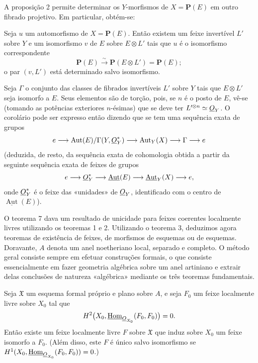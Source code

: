 A proposição 2 permite determinar os $Y$-morfismos de $X=\mathbf P(E)$ em
outro fibrado projetivo. Em particular, obtém-se:

 Seja $u$ um automorfismo de $X=\mathbf P(E)$. Então
existem um feixe invertível $L'$ sobre $Y$ e um isomorfismo $v$ de $E$ sobre
$E\otimes L'$ tais que $u$ é o isomorfismo correspondente
\[
  \mathbf P(E)\xrightarrow{\sim}\mathbf P(E\otimes L')=\mathbf P(E);
\]
o par $(v,L')$ está determinado salvo isomorfismo.

Seja $\Gamma$ o conjunto das classes de fibrados invertíveis $L'$ sobre $Y$
tais que $E\otimes L'$ seja isomorfo a $E$. Seus elementos são de torção, pois,
se $n$ é o posto de $E$, vê-se (tomando as potências exteriores $n$-ésimas)
que se deve ter $L'^{\otimes n}\simeq\underline{O}_Y$. O corolário pode ser expresso
então dizendo que se tem uma sequência exata de grupos
\[
  e\longrightarrow
  \operatorname{Aut}(E)/\Gamma(Y,\underline{O}_Y^*)
  \longrightarrow \operatorname{Aut}_Y(X)
  \longrightarrow \Gamma\longrightarrow e
\]
(deduzida, de resto, da sequência exata de cohomologia obtida a partir
da seguinte sequência exata de feixes de grupos
\[
  e\longrightarrow \underline{O}_Y^*
  \longrightarrow \underline{\operatorname{Aut}}(E)
  \longrightarrow \underline{\operatorname{Aut}}_Y(X)
  \longrightarrow e,
\]
onde $\underline{O}_Y^*$ é o feixe das «unidades» de $\underline{O}_Y$, identificado com o
centro de $\underline{\operatorname{Aut}}(E)$).


O teorema 7 dava um resultado de unicidade para feixes coerentes localmente
livres utilizando os teoremas 1 e 2. Utilizando o teorema 3, deduzimos agora
teoremas de existência de feixes, de morfismos de esquemas ou de esquemas.
Doravante, $A$ denota um anel noetheriano local, separado e completo. O método
geral consiste sempre em efetuar construções formais, o que consiste
essencialmente em fazer geometria algébrica sobre um anel artiniano e extrair
delas conclusões de natureza «algébrica» mediante os três teoremas
fundamentais.

 Seja $\mathfrak X$ um esquema formal próprio e plano
sobre $A$, e seja $F_0$ um feixe localmente livre sobre $X_0$ tal que
\[
  H^2\bigl(X_0,\underline{\operatorname{Hom}}_{\underline{O}_{X_0}}(F_0,F_0)\bigr)=0.
\]
Então existe um feixe localmente livre $F$ sobre $\mathfrak X$ que induz
sobre $X_0$ um feixe isomorfo a $F_0$. (Além disso, este $F$ é único salvo
isomorfismo se
$H^1(X_0,\underline{\operatorname{Hom}}_{\underline{O}_{X_0}}(F_0,F_0))=0$.)

